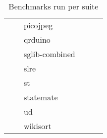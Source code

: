 \documentclass[../bachelor_paper.tex]{subfiles}
\begin{document}
\begin{table}
\begin{tabular}{llllll}
                            &                   & picojpeg          &                   &                   \\
                            &                   & qrduino           &                   &                   \\
                            &                   & sglib-combined    &                   &                   \\
                            &                   & slre              &                   &                   \\
                            &                   & st                &                   &                   \\
                            &                   & statemate         &                   &                   \\
                            &                   & ud                &                   &                   \\
                            &                   & wikisort          &                   &
    \end{tabular}
    \caption{Benchmarks run per suite}
    \label{tab:bench/sum/run}
\end{table}

\isstandalone



\fi
\end{document}
